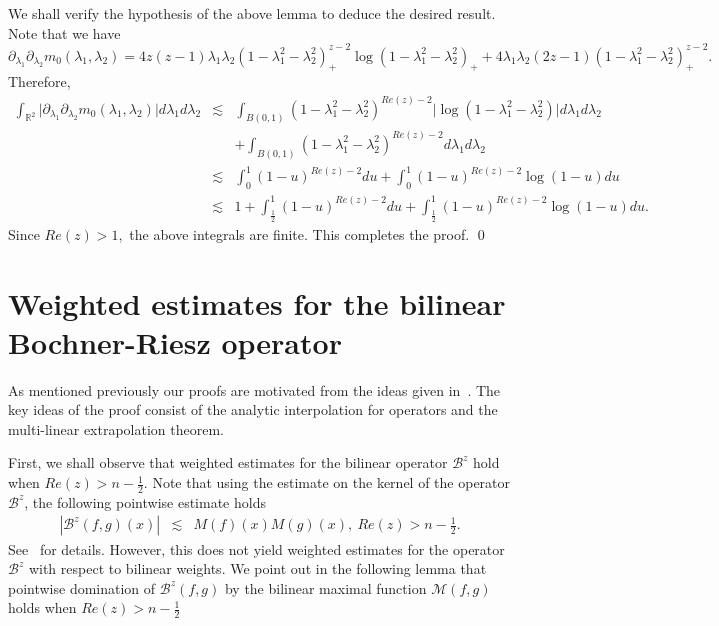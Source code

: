\documentclass[a4paper,12pt]{amsart}
\newtheorem{lemma}[theorem]{Lemma}
\begin{document}
 
We shall verify the hypothesis of the above lemma to deduce the desired result. Note that we have 
 $$\partial_{\lambda_{1}}\partial_{\lambda_{2}}m_{0}(\lambda_{1},\lambda_{2})=4z(z-1)\lambda_{1}\lambda_{2}(1- \lambda_{1}^{2}-\lambda_{2}^{2})^{z-2}_{+}\log(1- \lambda_{1}^{2}- \lambda_{2}^{2})_{+} + 4 \lambda_{1}\lambda_{2}(2z-1)(1- \lambda_{1}^{2}- \lambda_{2}^{2})^{z-2}_{+}.$$
 Therefore,
\begin{eqnarray*}
\int_{\mathbb{R}^{2}}\vert \partial_{\lambda_{1}}\partial_{\lambda_{2}}m_{0}(\lambda_{1},\lambda_{2})\vert d\lambda_{1}d \lambda_{2}
&\lesssim & \int_{B(0,1)}(1- \lambda_{1}^{2}-\lambda_{2}^{2})^{Re(z)-2}\vert\log(1- \lambda_{1}^{2}- \lambda_{2}^{2})\vert d\lambda_{1}d\lambda_{2}\\
& & +\int_{B(0,1)}(1- \lambda_{1}^{2}-\lambda_{2}^{2})^{Re(z)-2}d\lambda_{1}d \lambda_{2}\\
& \lesssim &  \int_{0}^{1}(1-u)^{Re(z)-2}du+ \int_{0}^{1}(1-u)^{Re(z)-2}\log(1-u)du \\
&  \lesssim & 1+ \int_{\frac{1}{2}}^{1}(1-u)^{Re(z)-2}du + \int_{\frac{1}{2}}^{1}(1-u)^{Re(z)-2}\log(1-u)du.
\end{eqnarray*}
Since $Re(z)>1,$ the above integrals are finite.
This completes the proof. 
\qed
  



\section{Weighted estimates for the bilinear Bochner-Riesz operator}\label{pfmain}

As mentioned previously our proofs are motivated from the ideas given in~\cite{XQ, Bern1}. The key ideas of the proof consist of the analytic interpolation for operators and the multi-linear extrapolation theorem. 

First, we shall observe that weighted estimates for the bilinear operator $\mathcal B^{z}$ hold when $Re(z)>n-\frac{1}{2}.$ Note that using the estimate on the kernel of the operator $\mathcal B^{z}$, the following   pointwise estimate holds 
\begin{eqnarray*}
|\mathcal B^{z}(f,g)(x)| &\lesssim & M(f)(x)M(g)(x),~
Re(z)>n-\frac{1}{2}.
\end{eqnarray*}
See~\cite{Bern1} for details. However, this does not yield weighted estimates for the operator $\mathcal B^{z}$ with respect to bilinear weights. We point out in the following lemma that pointwise domination of $\mathcal B^{z}(f,g)$ by the bilinear maximal function $\mathcal M(f,g)$ holds when $Re(z)>n-\frac{1}{2}$
\end{document}
